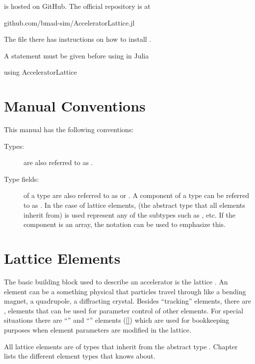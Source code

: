 \accellat is hosted on GitHub. The official repository is at
\begin{example}
  github.com/bmad-sim/AcceleratorLattice.jl
\end{example}
The  file there has instructions on how to install \accellat.

A  statement must be given before using \accellat in Julia
\begin{example}
  using AcceleratorLattice
\end{example}

\section{Manual Conventions}
\label{s:manual.con}

This manual has the following conventions:
\begin{description}
%
\item[Types:]
 are also referred to as .
%
\item[Type fields:]
 of a type are also referred to as  or .
A component  of a type  can be referred to as . In the case
of lattice elements,  (the abstract type that all elements inherit from) is
used represent any of the subtypes such as , etc. If the component
is an array, the notation  can be used to emphasize this.
%
\end{description}

\section{Lattice Elements}
\label{s:element.def}

The basic building block used to describe an accelerator is the lattice . An
element can be a something physical that particles travel through like a bending magnet, a
quadrupole, a diffracting crystal. Besides ``tracking'' elements, there are ,
elements that can be used for parameter control of other elements.
For special situations there are ``'' and ``'' elements (\ref{})
which are used for bookkeeping purposes when element parameters are modified in the lattice.

All lattice elements are of types that inherit from the abstract type .
Chapter~ lists the different element types that \bmad knows about.

